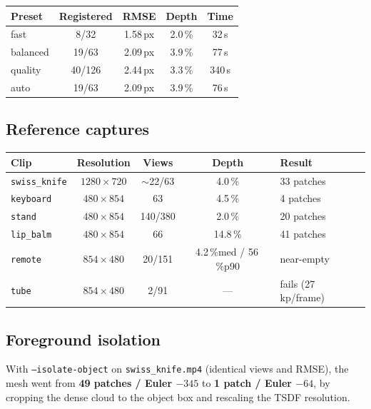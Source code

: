 \documentclass[11pt,a4paper]{article}
\newcommand{\pct}{\,\%}
\newcommand{\code}[1]{\texttt{#1}}
\begin{document}
\begin{center}
\begin{tabular}{lcccc}
\toprule
\textbf{Preset} & \textbf{Registered} & \textbf{RMSE} & \textbf{Depth} & \textbf{Time}\\
\midrule
fast & 8/32 & 1.58\,px & 2.0\pct & 32\,s\\
balanced & 19/63 & 2.09\,px & 3.9\pct & 77\,s\\
quality & 40/126 & 2.44\,px & 3.3\pct & 340\,s\\
auto & 19/63 & 2.09\,px & 3.9\pct & 76\,s\\
\bottomrule
\end{tabular}
\end{center}

\subsection{Reference captures}
\label{sec:captures}

\begin{center}
\begin{tabular}{lcccl}
\toprule
\textbf{Clip} & \textbf{Resolution} & \textbf{Views} & \textbf{Depth} & \textbf{Result}\\
\midrule
\code{swiss\_knife} & $1280\times720$ & $\sim$22/63 & 4.0\pct & 33 patches\\
\code{keyboard} & $480\times854$ & 63 & 4.5\pct & 4 patches\\
\code{stand} & $480\times854$ & 140/380 & 2.0\pct & 20 patches\\
\code{lip\_balm} & $480\times854$ & 66 & 14.8\pct & 41 patches\\
\code{remote} & $854\times480$ & 20/151 & 4.2\pct med / 56\pct p90 & near-empty\\
\code{tube} & $854\times480$ & 2/91 & --- & fails (27 kp/frame)\\
\bottomrule
\end{tabular}
\end{center}

\subsection{Foreground isolation}
\label{sec:iso-res}

With \code{--isolate-object} on \code{swiss\_knife.mp4} (identical views and RMSE), the mesh went
from \textbf{49 patches / Euler $-345$} to \textbf{1 patch / Euler $-64$}, by cropping the dense
cloud to the object box and rescaling the TSDF resolution.
\end{document}
